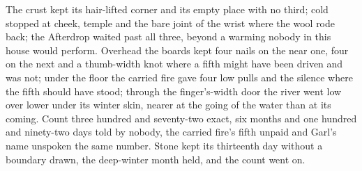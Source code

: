 The crust kept its hair-lifted corner and its empty place with no third; cold stopped at cheek, temple and the bare joint of the wrist where the wool rode back; the Afterdrop waited past all three, beyond a warming nobody in this house would perform. Overhead the boards kept four nails on the near one, four on the next and a thumb-width knot where a fifth might have been driven and was not; under the floor the carried fire gave four low pulls and the silence where the fifth should have stood; through the finger's-width door the river went low over lower under its winter skin, nearer at the going of the water than at its coming. Count three hundred and seventy-two exact, six months and one hundred and ninety-two days told by nobody, the carried fire's fifth unpaid and Garl's name unspoken the same number. Stone kept its thirteenth day without a boundary drawn, the deep-winter month held, and the count went on.
